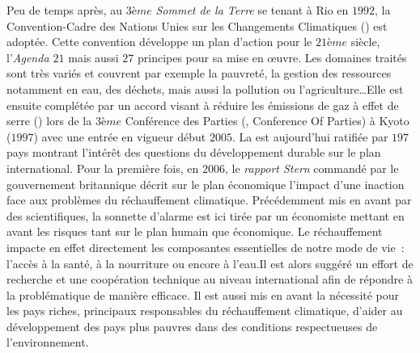 Peu de temps après, au $3ème$ \textit{Sommet de la Terre} se tenant à Rio en $1992$, la
Convention-Cadre des Nations Unies sur les Changements Climatiques
()
est adoptée. Cette convention développe un plan d’action pour le $21ème$ siècle,
l’\textit{Agenda $21$} mais aussi $27$ principes pour sa mise en œuvre. Les domaines
traités sont très variés et couvrent par exemple la pauvreté, la gestion des ressources
notamment en eau, des déchets, mais aussi la pollution ou l’agriculture\dots Elle est
ensuite complétée par un accord visant à réduire les émissions de gaz à effet de serre
() lors de la $3ème$ Conférence des Parties (, Conference Of Parties) à
Kyoto ($1997$) avec une entrée en vigueur début $2005$. La  est aujourd’hui
ratifiée par $197$ pays montrant l’intérêt des questions du développement durable sur le
plan international. Pour la première fois, en $2006$, le \textit{rapport Stern}
\parencite{Stern2006} commandé par le gouvernement britannique décrit sur le plan
économique l’impact d’une inaction face aux problèmes du réchauffement climatique.
Précédemment mis en avant par des scientifiques, la sonnette d’alarme est ici tirée par un
économiste mettant en avant les risques tant sur le plan humain que économique. Le
réchauffement impacte en effet directement les composantes essentielles de notre mode de
vie~: l’accès à la santé, à la nourriture ou encore à l’eau.Il est alors suggéré un effort
de recherche et une coopération technique au niveau international afin de répondre à la
problématique de manière efficace. Il est aussi mis en avant la nécessité pour les pays
riches, principaux responsables du réchauffement climatique, d’aider au développement des
pays plus pauvres dans des conditions respectueuses de l’environnement.

